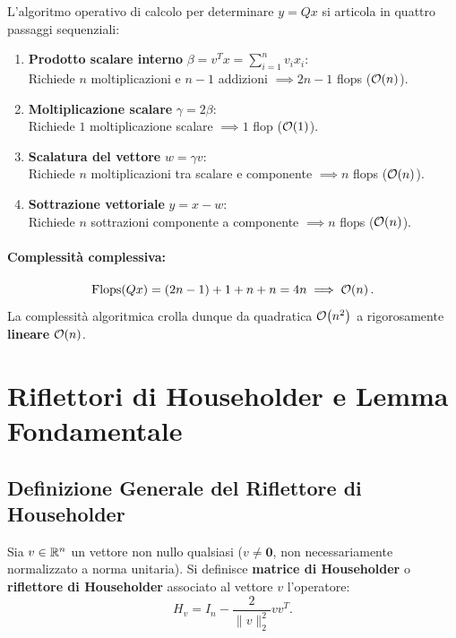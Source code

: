 L'algoritmo operativo di calcolo per determinare $y = Q x$ si articola in quattro passaggi sequenziali:
\begin{enumerate}
    \item \textbf{Prodotto scalare interno} $\beta = v^T x = \sum_{i=1}^n v_i x_i$:\\
    Richiede $n$ moltiplicazioni e $n - 1$ addizioni $\implies 2n - 1$ flops ($\mathcal{O}\!\left(n\right)$).
    \item \textbf{Moltiplicazione scalare} $\gamma = 2 \beta$:\\
    Richiede $1$ moltiplicazione scalare $\implies 1$ flop ($\mathcal{O}\!\left(1\right)$).
    \item \textbf{Scalatura del vettore} $w = \gamma v$:\\
    Richiede $n$ moltiplicazioni tra scalare e componente $\implies n$ flops ($\mathcal{O}\!\left(n\right)$).
    \item \textbf{Sottrazione vettoriale} $y = x - w$:\\
    Richiede $n$ sottrazioni componente a componente $\implies n$ flops ($\mathcal{O}\!\left(n\right)$).
\end{enumerate}

\paragraph{Complessit\`a complessiva:}
\begin{equation}
    \text{Flops}(Q x) = (2n - 1) + 1 + n + n = 4n \implies \mathcal{O}\!\left(n\right).
\end{equation}
La complessit\`a algoritmica crolla dunque da quadratica $\mathcal{O}\!\left(n^2\right)$ a rigorosamente \textbf{lineare} $\mathcal{O}\!\left(n\right)$.

\FloatBarrier
\section{Riflettori di Householder e Lemma Fondamentale}
\label{sec:riflettori-householder-lemma}

\subsection{Definizione Generale del Riflettore di Householder}

\begin{definition}
\label{def:riflettore-householder}
Sia $v \in \mathbb{R}^n$ un vettore non nullo qualsiasi ($v \neq \mathbf{0}$, non necessariamente normalizzato a norma unitaria). Si definisce \textbf{matrice di Householder} o \textbf{riflettore di Householder} associato al vettore $v$ l'operatore:
\begin{equation}
    H_v = I_n - \frac{2}{\|v\|_2^2} v v^T.
    \label{eq:riflettore-householder-gen}
\end{equation}
\end{definition}

